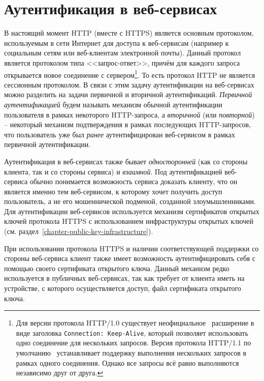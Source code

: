 \section{Аутентификация в веб-сервисах}

В настоящий момент HTTP (вместе с HTTPS) является основным протоколом, используемым в сети Интернет для доступа к веб-сервисам (например к социальным сетям или веб-клиентам электронной почты). Данный протокол является протоколом типа <<запрос-ответ>>, причём для каждого запроса открывается новое соединение с сервером\footnote{Для версии протокола HTTP/1.0 существует неофициальное~\cite[p.~17]{Totty:2002} расширение в виде заголовка \texttt{Connection: Keep-Alive}, который позволяет использовать одно соединение для нескольких запросов. Версия протокола HTTP/1.1 по умолчанию~\cite[6.3.~Persistence]{rfc7230} устанавливает поддержку выполнения нескольких запросов в рамках одного соединения. Однако все запросы всё равно выполняются независимо друг от друга.}. То есть протокол HTTP не является сессионным протоколом. В связи с этим задачу аутентификации на веб-сервисах можно разделить на задачи первичной и вторичной аутентификаций. \emph{Первичной аутентификацией} будем называть механизм обычной аутентификации пользователя в рамках некоторого HTTP-запроса, а \emph{вторичной} (или \emph{повторной}) -- некоторый механизм подтверждения в рамках последующих HTTP-запросов, что пользователь уже был \emph{ранее} аутентифицирован веб-сервисом в рамках первичной аутентификации.

Аутентификация в веб-сервисах также бывает \emph{односторонней} (как со стороны клиента, так и со стороны сервиса) и \emph{взаимной}. Под аутентификацией веб-сервиса обычно понимается возможность сервиса доказать клиенту, что он является именно тем веб-сервисом, к которому хочет получить доступ пользователь, а не его мошеннической подменой, созданной злоумышленниками. Для аутентификации веб-сервисов используется механизм сертификатов открытых ключей протокола HTTPS с использованием инфраструктуры открытых ключей (см. раздел~\ref{chapter-public-key-infrastructure}).

При использовании протокола HTTPS и наличии соответствующей поддержки со стороны веб-сервиса клиент также имеет возможность аутентифицировать себя с помощью своего сертификата открытого ключа. Данный механизм редко используется в публичных веб-сервисах, так как требует от клиента иметь на устройстве, с которого осуществляется доступ, файл сертификата открытого ключа.


